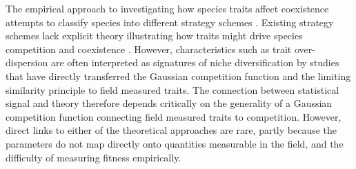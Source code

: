 \documentclass[a4paper,11pt]{article}
\begin{document}
The empirical approach to investigating how species traits affect
coexistence attempts to classify species into different strategy
schemes
\citep{Grime-1974,Grime-1979,Southwood-1977,Weiher-1999,Westoby-2002}.
%
%
Existing strategy schemes lack explicit theory illustrating how traits
might drive species competition and coexistence \citep{Adler-2013}.
However, characteristics such as trait over-dispersion are often
interpreted as
signatures of niche diversification \citep[e.g.][]{Kraft-2008} by
 studies that have directly transferred the Gaussian competition function and the limiting similarity principle  to field measured traits.
The connection between statistical signal and theory therefore depends
critically on the generality of a Gaussian competition function
connecting field measured traits to competition.
%
However, direct links to either of the theoretical approaches are
rare, partly because the parameters do not map directly onto
quantities measurable in the field, and the difficulty of measuring
fitness empirically.
\end{document}
